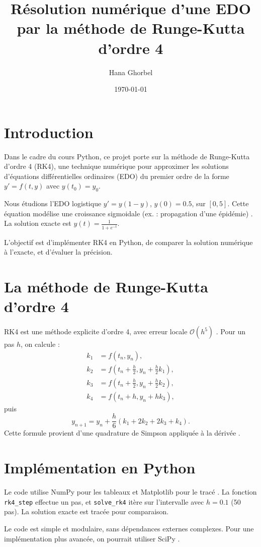\documentclass[12pt,a4paper]{article}
\title{Résolution numérique d'une EDO par la méthode de Runge-Kutta d'ordre 4}
\author{Hana Ghorbel}
\date{\today}
\begin{document}
\maketitle
\newpage

\section{Introduction}
Dans le cadre du cours Python, ce projet porte sur la méthode de Runge-Kutta d'ordre 4 (RK4), une technique numérique pour approximer les solutions d'équations différentielles ordinaires (EDO) du premier ordre de la forme $y' = f(t, y)$ avec $y(t_0) = y_0$.

Nous étudions l'EDO logistique $y' = y(1 - y)$, $y(0) = 0.5$, sur $[0, 5]$. Cette équation modélise une croissance sigmoidale (ex. : propagation d'une épidémie) \cite{verhulst}. La solution exacte est $y(t) = \frac{1}{1 + e^{-t}}$.

L'objectif est d'implémenter RK4 en Python, de comparer la solution numérique à l'exacte, et d'évaluer la précision.

\section{La méthode de Runge-Kutta d'ordre 4}
RK4 est une méthode explicite d'ordre 4, avec erreur locale $\mathcal{O}(h^5)$ \cite{butcher}. Pour un pas $h$, on calcule :
\begin{align*}
k_1 &= f(t_n, y_n), \\
k_2 &= f\left(t_n + \frac{h}{2}, y_n + \frac{h}{2} k_1\right), \\
k_3 &= f\left(t_n + \frac{h}{2}, y_n + \frac{h}{2} k_2\right), \\
k_4 &= f(t_n + h, y_n + h k_3),
\end{align*}
puis
\[
y_{n+1} = y_n + \frac{h}{6} (k_1 + 2k_2 + 2k_3 + k_4).
\]
Cette formule provient d'une quadrature de Simpson appliquée à la dérivée \cite{hairer}.

\section{Implémentation en Python}
Le code utilise NumPy pour les tableaux et Matplotlib pour le tracé \cite{numpy,matplotlib}. La fonction \texttt{rk4\_step} effectue un pas, et \texttt{solve\_rk4} itère sur l'intervalle avec $h = 0.1$ (50 pas). La solution exacte est tracée pour comparaison.

Le code est simple et modulaire, sans dépendances externes complexes. Pour une implémentation plus avancée, on pourrait utiliser SciPy \cite{scipy}.
\end{document}
